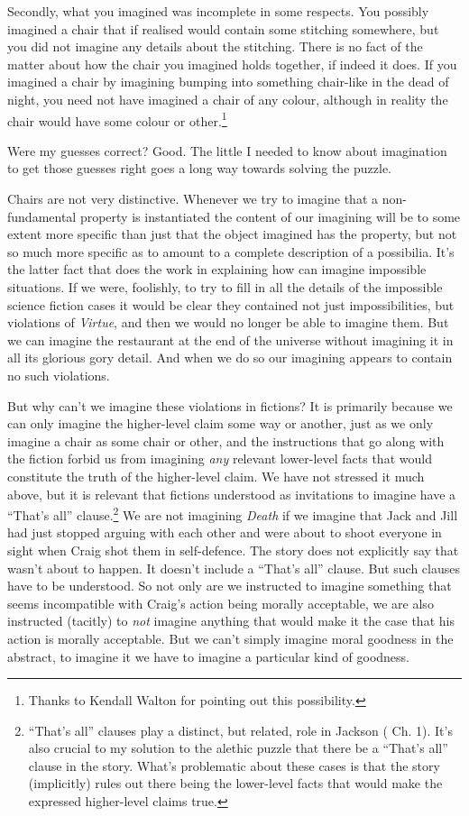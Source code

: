 \documentclass[
  11pt,
  letterpaper,
  DIV=11,
  numbers=noendperiod,
  twoside]{scrartcl}
\begin{document}
Secondly, what you imagined was incomplete in some respects. You
possibly imagined a chair that if realised would contain some stitching
somewhere, but you did not imagine any details about the stitching.
There is no fact of the matter about how the chair you imagined holds
together, if indeed it does. If you imagined a chair by imagining
bumping into something chair-like in the dead of night, you need not
have imagined a chair of any colour, although in reality the chair would
have some colour or other.\footnote{Thanks to Kendall Walton for
  pointing out this possibility.}

Were my guesses correct? Good. The little I needed to know about
imagination to get those guesses right goes a long way towards solving
the puzzle.

Chairs are not very distinctive. Whenever we try to imagine that a
non-fundamental property is instantiated the content of our imagining
will be to some extent more specific than just that the object imagined
has the property, but not so much more specific as to amount to a
complete description of a possibilia. It's the latter fact that does the
work in explaining how can imagine impossible situations. If we were,
foolishly, to try to fill in all the details of the impossible science
fiction cases it would be clear they contained not just impossibilities,
but violations of \emph{Virtue}, and then we would no longer be able to
imagine them. But we can imagine the restaurant at the end of the
universe without imagining it in all its glorious gory detail. And when
we do so our imagining appears to contain no such violations.

But why can't we imagine these violations in fictions? It is primarily
because we can only imagine the higher-level claim some way or another,
just as we only imagine a chair as some chair or other, and the
instructions that go along with the fiction forbid us from imagining
\emph{any} relevant lower-level facts that would constitute the truth of
the higher-level claim. We have not stressed it much above, but it is
relevant that fictions understood as invitations to imagine have a
``That's all'' clause.\footnote{``That's all'' clauses play a distinct,
  but related, role in Jackson ( Ch. 1).
  It's also crucial to my solution to the alethic puzzle that there be a
  ``That's all'' clause in the story. What's problematic about these
  cases is that the story (implicitly) rules out there being the
  lower-level facts that would make the expressed higher-level claims
  true.} We are not imagining \emph{Death} if we imagine that Jack and
Jill had just stopped arguing with each other and were about to shoot
everyone in sight when Craig shot them in self-defence. The story does
not explicitly say that wasn't about to happen. It doesn't include a
``That's all'' clause. But such clauses have to be understood. So not
only are we instructed to imagine something that seems incompatible with
Craig's action being morally acceptable, we are also instructed
(tacitly) to \emph{not} imagine anything that would make it the case
that his action is morally acceptable. But we can't simply imagine moral
goodness in the abstract, to imagine it we have to imagine a particular
kind of goodness.
\end{document}
